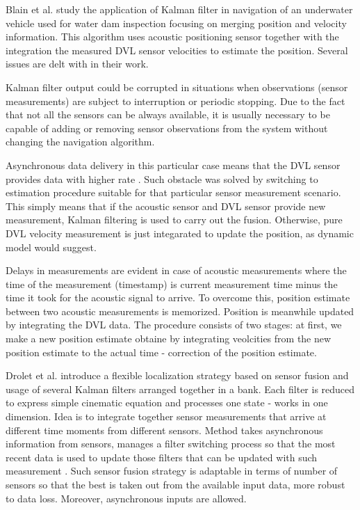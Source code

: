 Blain et al. \cite{blain03} study the application of Kalman filter in navigation of an underwater vehicle used for water dam inspection focusing on merging position and velocity information. This algorithm uses acoustic positioning sensor together with the integration the measured DVL sensor velocities \cite{blain03} to estimate the position. Several issues are delt with in their work. 

Kalman filter output could be corrupted in situations when observations (sensor measurements) are subject to interruption or periodic stopping. Due to the fact that not all the sensors can be always available, it is usually necessary to be capable of adding or removing sensor observations from the system without changing the navigation algorithm. 

Asynchronous data delivery in this particular case means that the DVL sensor provides data with higher rate \cite{blain03}. Such obstacle was solved by switching to estimation procedure suitable for that particular sensor measurement scenario. This simply means that if the acoustic sensor and DVL sensor provide new measurement, Kalman filtering is used to carry out the fusion. Otherwise, pure DVL velocity measurement is just integarated to update the position, as dynamic model would suggest. 

Delays in measurements are evident in case of acoustic measurements where the time of the measurement (timestamp) is current measurement time minus the time it took for the acoustic signal to arrive. To overcome this, position estimate between two acoustic measurements is memorized. Position is meanwhile updated by integrating the DVL data. The procedure consists of two stages: at first, we make a new position estimate obtaine by integrating veolcities from the new position estimate to the actual time - correction of the position estimate. 

Drolet et al. \cite{drolet00} introduce a flexible localization strategy based on sensor fusion and usage of several Kalman filters arranged together in a bank. Each filter is reduced to express simple cinematic equation and processes one state - works in one dimension. Idea is to integrate together sensor measurements that arrive at different time moments from different sensors. Method takes asynchronous information from sensors, manages a filter switching process so that the most recent data is used to update those filters that can be updated with such measurement \cite{drolet00}. Such sensor fusion strategy is adaptable in terms of number of sensors so that the best is taken out from the available input data, more robust to data loss. Moreover, asynchronous inputs are allowed. 

